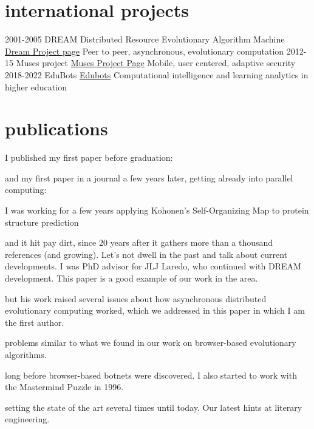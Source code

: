 \documentclass[]{friggeri-jj-cv}
\begin{document}
\section{international projects}

\begin{entrylist}
  \entry
    {2001-2005}
    {{\sf DREAM} Distributed Resource Evolutionary Algorithm Machine}
    {\href{http://www.soc.napier.ac.uk/~benp/dream/dream.htm}{Dream
        Project page}}
    {Peer to peer, asynchronous, evolutionary computation}
  \entry
    {2012-15}
    {Muses project}
    {\href{https://musesproject.eu/}{Muses Project Page}}
    {Mobile, user centered, adaptive security}
    \entry
    {2018-2022}
    {EduBots}
    {\href{https://edubots.eu}{Edubots}}
    {Computational intelligence and learning analytics in higher education}
\end{entrylist}

\section{publications}

I published my first paper before graduation:

\cite{merelo88}

and my first paper in a journal a few years later, getting already
into parallel computing:

\cite{parallel90}
I was working for a few years applying Kohonen's Self-Organizing Map to protein structure prediction

\cite{jjproteng}
and it hit pay dirt, since 20 years after it gathers more than a
thousand references (and growing). Let's not dwell in the past
and talk about current developments. I was PhD advisor for JLJ Laredo,
who continued with DREAM development. This paper is a good example of
our work in the area.

\cite{evag:gpem}
but his work raised several issues about how asynchronous distributed
evolutionary computing worked, which we addressed in this paper in
which I am the first author.

\cite{jj:2008:PPSN}
problems similar to what we found in our work on browser-based
evolutionary algorithms.

\cite{agajaj}
long before browser-based botnets were discovered. I also started to
work with the Mastermind Puzzle in 1996.

\cite{jj-ppsn96}
setting the state of the art several times until today. Our latest hints at
literary engineering.
\end{document}
